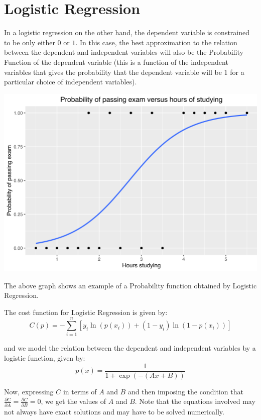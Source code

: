\documentclass[12 pt]{report}
\begin{document}
    \section{Logistic Regression}
    In a logistic regression on the other hand, the dependent variable is constrained to be only either $0$ or $1$.
    In this case, the best approximation to the relation between the dependent and independent variables will also be the
    Probability Function of the dependent variable (this is a function of the independent variables that gives the probability 
    that the dependent variable will be $1$ for a particular choice of independent variables).



    \includegraphics[scale = 0.55]{logistic.png}

    The above graph shows an example of a Probability function obtained by Logistic Regression.
    
    The cost function for Logistic Regression is given by:
    \begin{equation}
        C(p) = -\sum_{i = 1}^{n} [y_{i}\ln(p(x_{i})) + (1-y_{i})\ln(1 - p(x_{i}))]
    \end{equation}

    and we model the relation between the dependent and independent variables by a logistic function, given by:
    \begin{equation}
        p(x) = \frac{1}{1 + \exp(-(Ax + B))}
    \end{equation}

    Now, expressing $C$ in terms of $A$ and $B$ and then imposing the condition that $\frac{\partial C}{\partial A} = \frac{\partial C}{\partial B} = 0$, 
    we get the values of $A$ and $B$. Note that the equations involved may not always have exact solutions and may have to be solved numerically.
\end{document}

